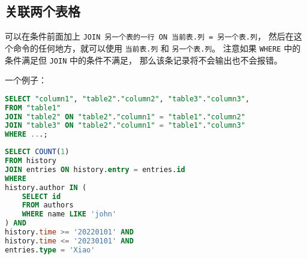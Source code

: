 \subsection{关联两个表格}
可以在条件前面加上 \verb`JOIN 另一个表的一行 ON 当前表.列 = 另一个表.列`， 然后在这个命令的任何地方，就可以使用 \verb`当前表.列` 和 \verb`另一个表.列`。 注意如果 \verb`WHERE` 中的条件满足但 \verb`JOIN` 中的条件不满足， 那么该条记录将不会输出也不会报错。

一个例子：
\begin{lstlisting}[language=sql]
SELECT "column1", "table2"."column2", "table3"."column3",
FROM "table1"
JOIN "table2" ON "table2"."column1" = "table1"."column2"
JOIN "table3" ON "table2"."column1" = "table1"."column3"
WHERE ...;
\end{lstlisting}

\begin{lstlisting}[language=sql,caption=stat.sh]
SELECT COUNT(1) 
FROM history 
JOIN entries ON history.entry = entries.id 
WHERE 
history.author IN ( 
    SELECT id 
    FROM authors 
    WHERE name LIKE 'john' 
) AND 
history.time >= '20220101' AND 
history.time <= '20230101' AND 
entries.type = 'Xiao'
\end{lstlisting}
